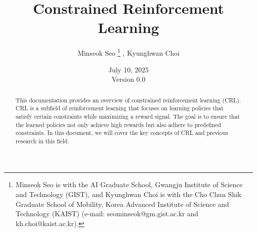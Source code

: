 \documentclass{article}
\title{
    Constrained Reinforcement Learning
}
\author{
    Minseok Seo
    \thanks{
        Minseok Seo is with the AI Graduate School, Gwangju Institute of Science and Technology (GIST), and Kyunghwan Choi is with the Cho Chun Shik Graduate School of Mobility, Korea Advanced Institute of Science and Technology (KAIST) (e-mail: seominseok@gm.gist.ac.kr and kh.choi@kaist.ac.kr).
        }%
    ,
    Kyunghwan Choi
    \footnotemark[1]
}
\date{
    July 10, 2025
    \\
    Version 0.0
}
\newcommand*{\template}{../template}
\begin{document}
\maketitle

\begin{abstract}
    This documentation provides an overview of constrained reinforcement learning (CRL).
    CRL is a subfield of reinforcement learning that focuses on learning policies that satisfy certain constraints while maximizing a reward signal.
    The goal is to ensure that the learned policies not only achieve high rewards but also adhere to predefined constraints.
    In this document, we will cover the key concepts of CRL and previous research in this field.
\end{abstract}

\tableofcontents








\begin{appendices}

\end{appendices}



\end{document}
